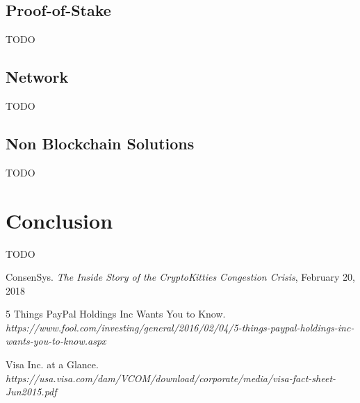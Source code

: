 \documentclass{article}
\begin{document}
\subsection{Proof-of-Stake}
TODO

\subsection{Network}
TODO

\subsection{Non Blockchain Solutions}
TODO

\section{Conclusion}
TODO

\begin{thebibliography}{1}

ConsenSys. 
\textit{The Inside Story of the CryptoKitties Congestion Crisis}, February 20, 2018

5 Things PayPal Holdings Inc Wants You to Know.
\textit{https://www.fool.com/investing/general/2016/02/04/5-things-paypal-holdings-inc-wants-you-to-know.aspx}

Visa Inc. at a Glance.
\textit{https://usa.visa.com/dam/VCOM/download/corporate/media/visa-fact-sheet-Jun2015.pdf}


\end{thebibliography}
\end{document}
